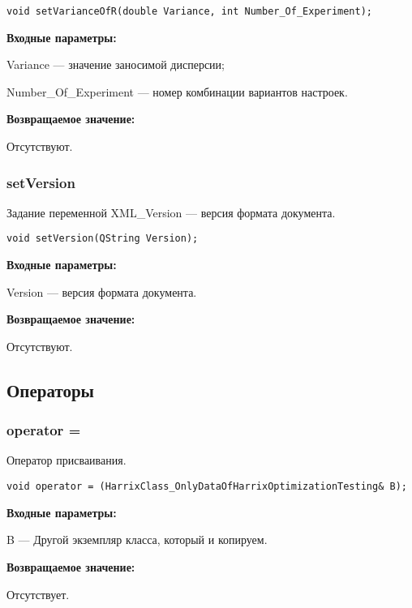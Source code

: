 \documentclass[a4paper,12pt]{article}
\begin{document}
\begin{lstlisting}[label=code_syntax_setVarianceOfR,caption=Синтаксис]
void setVarianceOfR(double Variance, int Number_Of_Experiment);
\end{lstlisting}

\textbf{Входные параметры:}

Variance --- значение заносимой дисперсии;

Number\_Of\_Experiment --- номер комбинации вариантов настроек.

\textbf{Возвращаемое значение:}

Отсутствуют.


\subsubsection{setVersion}\label{setVersion}

Задание переменной XML\_Version --- версия формата документа.


\begin{lstlisting}[label=code_syntax_setVersion,caption=Синтаксис]
void setVersion(QString Version);
\end{lstlisting}

\textbf{Входные параметры:}

Version --- версия формата документа.

\textbf{Возвращаемое значение:}

Отсутствуют.


\subsection{Операторы}

\subsubsection{operator =}\label{operator =}

Оператор присваивания.


\begin{lstlisting}[label=code_syntax_operator =,caption=Синтаксис]
void operator = (HarrixClass_OnlyDataOfHarrixOptimizationTesting& B);
\end{lstlisting}

\textbf{Входные параметры:}

B --- Другой экземпляр класса, который и копируем.

\textbf{Возвращаемое значение:}

Отсутствует.
\end{document}
